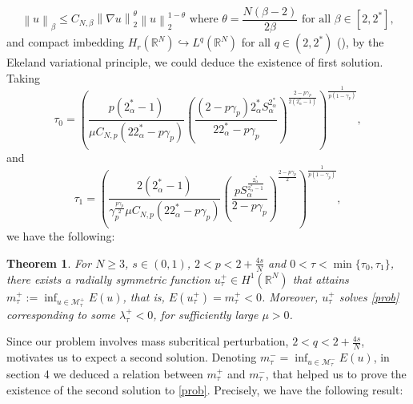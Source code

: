 \documentclass[11pt]{article}
\numberwithin{equation}{section}
\newtheorem{mytheorem}{Theorem}
\numberwithin{mytheorem}{section}
\begin{document}
	\begin{equation}\label{G_N_inequality}
		\left\| u \right\|_\beta\leq C_{N,\beta}\left\| \nabla u \right\|_2^{\theta}\left\| u \right\|_2^{1-\theta} \text{ where } \theta=\frac{N(\beta-2)}{2\beta} \text{ for all }\beta\in [2,2^*],
	\end{equation}
	and compact imbedding $H_r(\mathbb{R}^N)\hookrightarrow L^q(\mathbb{R}^N)$ for all $q\in (2,2^*)$ (\cite[Lemma~3.1.4]{Badiale2010Semilinear}), by the Ekeland variational principle, we could deduce the existence of first solution. Taking 
	$$\tau_0=\left(\frac{p(2^*_{\alpha}-1)}{\mu C_{N,p}(22^*_{\alpha}-p\gamma_p)}\left(\frac{(2-p\gamma_p)2^*_{\alpha}S_{\alpha}^{2^*_{\alpha}}}{22^*_{\alpha}-p\gamma_p}\right)^{\frac{2-p\gamma_p}{2(2^*_{\alpha}-1)}}\right)^{\frac{1}{p(1-\gamma_p)}},$$
	and $$\tau_1=\left(\frac{2(2^*_{\alpha}-1)}{\gamma_p^{\frac{p\gamma_p}{2}}\mu C_{N,p}(22^*_{\alpha}-p\gamma_p)}\left(\frac{pS_{\alpha}^{\frac{2^*_{\alpha}}{2^*_{\alpha}-1}}}{2-p\gamma_p}\right)^{\frac{2-p\gamma_p}{2}}\right)^{\frac{1}{p(1-\gamma_p)}},$$
	we have the following:
	\begin{mytheorem}\label{Theorem 1}
		For $N\geq 3$, $s\in (0,1)$, $2<p<2+\frac{4s}{N}$ and $0<\tau<\min\{\tau_0,\tau_1\}$, there exists a radially symmetric function $u_{\tau}^+\in H^1(\mathbb{R}^N)$ that attains $m_{\tau}^+:=\displaystyle \inf_{u\in \mathcal{M}_{\tau}^+}E(u)$, that is, $E(u_{\tau}^+)=m_{\tau}^+<0$. Moreover, $u_{\tau}^+$ solves \eqref{prob} corresponding to some $\lambda_{\tau}^+<0$, for sufficiently large $\mu>0$.
	\end{mytheorem}
	\noindent Since our problem involves mass subcritical perturbation, $2<q<2+\frac{4s}{N}$, \cite{Jeanjean2022multiple} motivates us to expect a second solution.
	Denoting $m_{\tau}^-=\displaystyle \inf_{u\in \mathcal{M}_{\tau}^-}E(u)$, 
	in section 4 we deduced a relation between $m_{\tau}^+$ and $m_{\tau}^-$, that helped us to prove the existence of the second solution to \eqref{prob}. Precisely, we have the following result:
\end{document}
